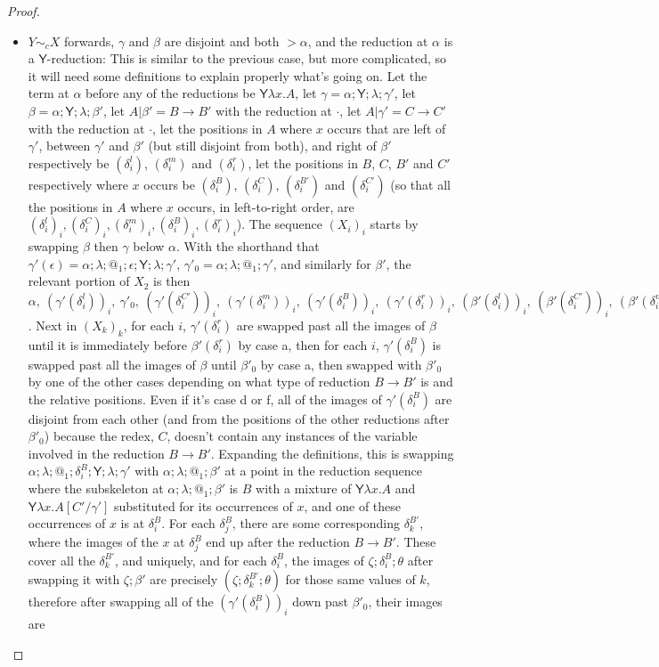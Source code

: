 \documentclass{article}
\newcommand{\tY}{\mathsf{Y}}
\theoremstyle{definition}
\theoremstyle{lemma}
\theoremstyle{remark}
\begin{document}
\begin{proof}
\begin{itemize}
\item $Y \sim_c X$ forwards, $\gamma$ and $\beta$ are disjoint and both $> \alpha$, and the reduction at $\alpha$ is a $\tY$-reduction: This is similar to the previous case, but more complicated, so it will need some definitions to explain properly what's going on. Let the term at $\alpha$ before any of the reductions be $\tY \lambda x. A$, let $\gamma = \alpha;\tY;\lambda;\gamma'$, let $\beta = \alpha;\tY;\lambda;\beta'$, let $A | \beta' = B \to B'$ with the reduction at $\cdot$, let $A | \gamma' = C \to C'$ with the reduction at $\cdot$, let the positions in $A$ where $x$ occurs that are left of $\gamma'$, between $\gamma'$ and $\beta'$ (but still disjoint from both), and right of $\beta'$ respectively be $(\delta^l_i)$, $(\delta^m_i)$ and $(\delta^r_i)$, let the positions in $B$, $C$, $B'$ and $C'$ respectively where $x$ occurs be $(\delta^B_i)$, $(\delta^C_i)$, $(\delta^{B'}_i)$ and $(\delta^{C'}_i)$ (so that all the positions in $A$ where $x$ occurs, in left-to-right order, are $(\delta^l_i)_i, (\delta^C_i)_i, (\delta^m_i)_i, (\delta^B_i)_i, (\delta^r_i)_i$). The sequence $(X_i)_i$ starts by swapping $\beta$ then $\gamma$ below $\alpha$. With the shorthand that $\gamma'(\epsilon) = \alpha;\lambda;@_1;\epsilon;\tY;\lambda;\gamma'$, $\gamma'_0 = \alpha;\lambda;@_1;\gamma'$, and similarly for $\beta'$, the relevant portion of $X_2$ is then $\alpha,\ (\gamma'(\delta^l_i))_i,\ \gamma'_0,\ (\gamma'(\delta^{C'}_i))_i,\ (\gamma'(\delta^m_i))_i,\ (\gamma'(\delta^B_i))_i,\ (\gamma'(\delta^r_i))_i,\ (\beta'(\delta^l_i))_i,\ (\beta'(\delta^{C'}_i))_i,\ (\beta'(\delta^m_i))_i,\ \beta'_0,\ (\beta'(\delta^{B'}_i))_i,\ (\beta'(\delta^r_i))_i$. Next in $(X_k)_k$, for each $i$, $\gamma'(\delta^r_i)$ are swapped past all the images of $\beta$ until it is immediately before $\beta'(\delta^r_i)$ by case a, then for each $i$, $\gamma'(\delta^B_i)$ is swapped past all the images of $\beta$ until $\beta'_0$ by case a, then swapped with $\beta'_0$ by one of the other cases depending on what type of reduction $B \to B'$ is and the relative positions. Even if it's case d or f, all of the images of $\gamma'(\delta^B_i)$ are disjoint from each other (and from the positions of the other reductions after $\beta'_0$) because the redex, $C$, doesn't contain any instances of the variable involved in the reduction $B \to B'$. Expanding the definitions, this is swapping $\alpha;\lambda;@_1;\delta^B_i;\tY;\lambda;\gamma'$ with $\alpha;\lambda;@_1;\beta'$ at a point in the reduction sequence where the subskeleton at $\alpha;\lambda;@_1;\beta'$ is $B$ with a mixture of $\tY \lambda x. A$ and $\tY \lambda x. A[C'/\gamma']$ substituted for its occurrences of $x$, and one of these occurrences of $x$ is at $\delta^B_i$. For each $\delta^B_j$, there are some corresponding $\delta^{B'}_k$, where the images of the $x$ at $\delta^B_j$ end up after the reduction $B \to B'$. These cover all the $\delta^{B'}_k$, and uniquely, and for each $\delta^B_i$, the images of $\zeta;\delta^B_i;\theta$ after swapping it with $\zeta;\beta'$ are precisely $(\zeta;\delta^{B'}_k;\theta)$ for those same values of $k$, therefore after swapping all of the $(\gamma'(\delta^B_i))_i$ down past $\beta'_0$, their images are 
\end{itemize}
\end{proof}
\end{document}

